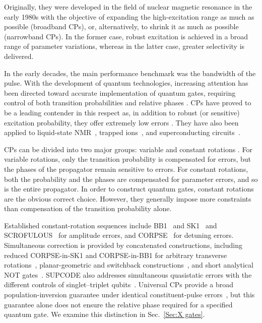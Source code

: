 \documentclass[10pt,aps,twocolumn,pra,floatfix,superscriptaddress]{revtex4-2}
\begin{document}
Originally, they were developed in the field of nuclear magnetic resonance in the early 1980s \cite{FREEMAN1980453,LEVITT198661} with the objective of expanding the high-excitation range as much as possible (broadband CPs), or, alternatively, to shrink it as much as possible \cite{NRPBCP,BoyqnNB} (narrowband CPs). 
In the former case, robust excitation is achieved in a broad range of parameter variations, whereas in the latter case, greater selectivity is delivered.

In the early decades, the main performance benchmark was the bandwidth of the pulse.
With the development of quantum technologies, increasing attention has been directed toward accurate implementation of quantum gates, requiring control of both transition probabilities and relative phases \cite{Shi_2022,fidelityCp,wolfibook,qgates1,qgates2,kajsagates}.
CPs have proved to be a leading contender in this respect as, in addition to robust (or sensitive) excitation probability, they offer extremely low errors \cite{torosov2011high}. They have also been applied to liquid-state NMR~\cite{Bando_2020_NMR}, trapped ions~\cite{Timoney_2008}, and superconducting circuits~\cite{Collin_2004}. 

CPs can be divided into two major groups: variable and constant rotations \cite{SAKELLARIOU200225}.
For variable rotations, only the transition probability is compensated for errors, but the phases of the propagator remain sensitive to errors.
For constant rotations, both the probability and the phases are compensated for parameter errors, and so is the entire propagator.
In order to construct quantum gates, constant rotations are the obvious correct choice.
However, they generally impose more constraints than compensation of the transition probability alone.

Established constant-rotation sequences include BB1~\cite{NRPBCP} and SK1~\cite{Brown_2004} and SCROFULOUS~\cite{Cummins_2003} for amplitude errors, and CORPSE~\cite{Cummins_2003} for detuning errors. Simultaneous correction is provided by concatenated constructions, including reduced CORPSE-in-SK1 and CORPSE-in-BB1 for arbitrary transverse rotations~\cite{Bando_2013}, planar-geometric and switchback constructions~\cite{Ichikawa_2014_planar,Kukita_2022_switchback}, and short analytical NOT gates~\cite{Jones_2013_NOT,Odedra_2012}. SUPCODE also addresses simultaneous quasistatic errors with the different controls of singlet--triplet qubits~\cite{Wang_2014_SUPCODE}. Universal CPs provide a broad population-inversion guarantee under identical constituent-pulse errors~\cite{PhysRevLett.113.043001,Genov_2020_profile}, but this guarantee alone does not ensure the relative phase required for a specified quantum gate. We examine this distinction in Sec.~\ref{Sec:X gates}.
\end{document}
